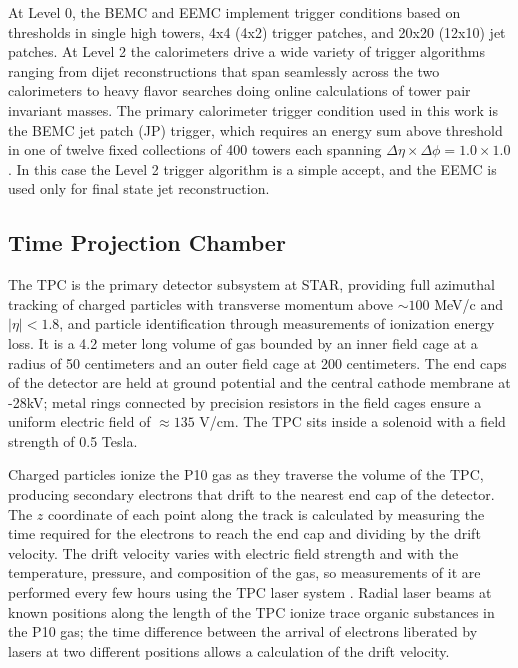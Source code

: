 At Level 0, the BEMC and EEMC implement trigger conditions based on thresholds
in single high towers, 4x4 (4x2) trigger patches, and 20x20 (12x10) jet
patches. At Level 2 the calorimeters drive a wide variety of trigger
algorithms ranging from dijet reconstructions that span seamlessly across the
two calorimeters to heavy flavor searches doing online calculations of tower
pair invariant masses. The primary calorimeter trigger condition used in this
work is the BEMC jet patch (JP) trigger, which requires an energy sum above
threshold in one of twelve fixed collections of 400 towers each spanning
$\Delta \eta \times \Delta \phi = 1.0 \times 1.0$. In this case the Level 2
trigger algorithm is a simple accept, and the EEMC is used only for final
state jet reconstruction.


\subsection{Time Projection Chamber}

The TPC \cite{Anderson:2003ur} is the primary detector subsystem at STAR,
providing full azimuthal tracking of charged particles with transverse
momentum above $\sim 100$ MeV/c and $|\eta| < 1.8$, and particle
identification through measurements of ionization energy loss. It is a 4.2
meter long volume of gas bounded by an inner field cage at a radius of 50
centimeters and an outer field cage at 200 centimeters. The end caps of the
detector are held at ground potential and the central cathode membrane at
-28kV; metal rings connected by precision resistors in the field cages ensure
a uniform electric field of $\approx 135$ V/cm. The TPC sits inside a solenoid
with a field strength of 0.5 Tesla.

Charged particles ionize the P10 gas as they traverse the volume of the TPC,
producing secondary electrons that drift to the nearest end cap of the
detector. The $z$ coordinate of each point along the track is calculated by
measuring the time required for the electrons to reach the end cap and
dividing by the drift velocity. The drift velocity varies with electric field
strength and with the temperature, pressure, and composition of the gas, so
measurements of it are performed every few hours using the TPC laser system
\cite{Abele:2003aa}. Radial laser beams at known positions along the length of
the TPC ionize trace organic substances in the P10 gas; the time difference
between the arrival of electrons liberated by lasers at two different
positions allows a calculation of the drift velocity.

